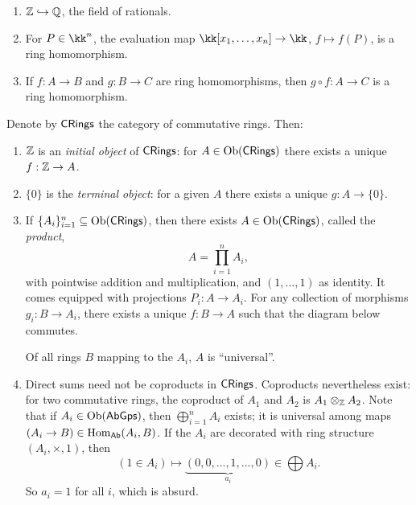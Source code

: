 \documentclass[11pt,a4paper]{article}
\begin{document}
\setcounter{example}{1}\begin{example}
\begin{enumerate}[label=(\roman*)]
\setcounter{enumi}{0}\item $\mathbb{Z}\hookrightarrow\mathbb{Q}$, the field of rationals.
\setcounter{enumi}{1}\item For $P\in\kk^n$, the evaluation map $\kk[x_1,\ldots,x_n]\to\kk$, $f\mapsto f(P)$, is a ring homomorphism.
\setcounter{enumi}{2}\item If $f:A\to B$ and $g:B\to C$ are ring homomorphisms, then $g\circ f:A\to C$ is a ring homomorphism.
\end{enumerate}
\end{example}
\begin{remark}
Denote by $\mathsf{CRings}$ the category of commutative rings. Then:
\begin{enumerate}[label=(\roman*)]
\setcounter{enumi}{0}\item $\mathbb{Z}$ is an \emph{initial object} of $\mathsf{CRings}$: for $A\in\operatorname{Ob}(\mathsf{CRings})$ there exists a unique $f:\mathbb{Z}\to A$.
\setcounter{enumi}{1}\item $\{0\}$ is the \emph{terminal object}: for a given $A$ there exists a unique $g:A\to\{0\}$.
\setcounter{enumi}{2}\item If $\{A_i\}_{i=1}^n\subseteq\operatorname{Ob}(\mathsf{CRings})$, then there exists $A\in\operatorname{Ob}(\mathsf{CRings})$, called the \emph{product},
\[
A=\prod_{i=1}^n A_i,
\]
with pointwise addition and multiplication, and $(1,\ldots,1)$ as identity. It comes equipped with projections $P_i:A\to A_i$. For any collection of morphisms $g_i:B\to A_i$,
there exists a unique $f:B\to A$ such that the diagram below commutes.
\begin{figure}[H]\centering
{}
\end{figure}
Of all rings $B$ mapping to the $A_i$, $A$ is ``universal''.
\setcounter{enumi}{3}\item Direct sums need not be coproducts in $\mathsf{CRings}$. Coproducts nevertheless exist: for two commutative rings, the coproduct of $A_1$ and $A_2$ is $A_1\otimes_{\mathbb{Z}}A_2$.
Note that if $A_i\in\operatorname{Ob}(\mathsf{AbGps})$, then $\bigoplus_{i=1}^n A_i$ exists; it is universal among maps $(A_i\to B)\in\operatorname{Hom}_{\mathsf{Ab}}(A_i,B)$. If the $A_i$ are decorated with ring structure $(A_i,\times,1)$, then
\[
(1\in A_i)\longmapsto\underbrace{(0,0,\ldots,1,\ldots,0)}_{a_i}\in\bigoplus A_i.
\]
So $a_i=1$ for all $i$, which is absurd.
\end{enumerate}
\end{remark}
\end{document}
